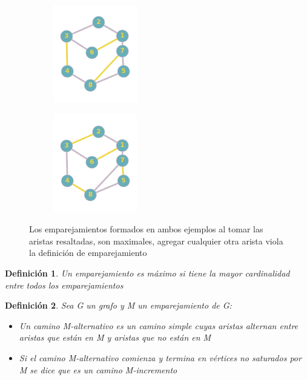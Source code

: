 \documentclass[a4paper,1pt]{report}
\newtheorem*{dfn}{Definición}
\begin{document}
\begin{figure}[H]
    \centering
    \begin{subfigure}[b]{0.40\textwidth}
        \centering
        \includegraphics[width=0.4\textwidth]{figures7/maximal.png}
    \end{subfigure} 
    \begin{subfigure}[b]{0.40\textwidth}
        \centering
        \includegraphics[width=0.4\textwidth]{figures7/maximo.png}
    \end{subfigure}
    \caption{Los emparejamientos formados en ambos ejemplos al tomar las aristas resaltadas, son maximales, agregar cualquier otra arista viola la definici\'on de emparejamiento}
\end{figure} 

\begin{dfn}
 Un emparejamiento es máximo si tiene la mayor cardinalidad entre todos los emparejamientos
\end{dfn}


\begin{dfn}
 Sea G un grafo y M un emparejamiento de G:
 \begin{itemize}
  \item Un camino M-alternativo es un camino simple cuyas aristas alternan entre aristas que están en M y aristas que no están en M
  \item Si el camino M-alternativo comienza y termina en vértices no saturados por M se dice que es un camino M-incremento
 \end{itemize}
\end{dfn}
\end{document}
